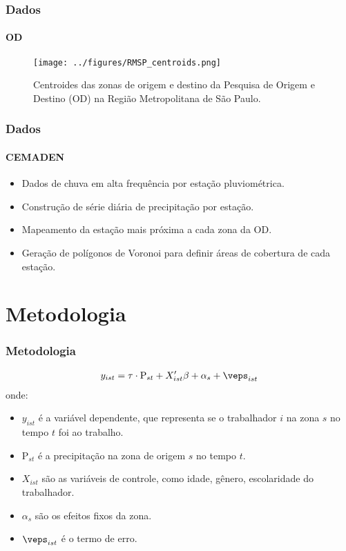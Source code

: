\begin{frame}[plain]
    \frametitle{Dados}
    \framesubtitle{OD}
    \begin{figure}[H]
        \centering
        \texttt{[image: ../figures/RMSP\_centroids.png]}
        \caption{Centroides das zonas de origem e destino da Pesquisa de Origem e Destino (OD) na Região Metropolitana de São Paulo.}
        \label{fig:od_centroids}
    \end{figure} 
\end{frame}



\begin{frame}
    \frametitle{Dados}
    \framesubtitle{CEMADEN}
    \begin{itemize}
    \item Dados de chuva em alta frequência por estação pluviométrica.
    \item Construção de série diária de precipitação por estação.
    \item Mapeamento da estação mais próxima a cada zona da OD.
    \item Geração de polígonos de Voronoi para definir áreas de cobertura de cada estação.
    \end{itemize}
\end{frame}

\section{Metodologia}
\begin{frame}[plain]
    \frametitle{Metodologia}
    \begin{align*}
    y_{ist} &= \tau \cdot \text{P}_{st} + X_{ist}'\beta + \alpha_{s} + \veps_{ist} \\ 
    \end{align*}
    onde:
    \begin{itemize}
        \item $y_{ist}$ é a variável dependente, que representa se o trabalhador $i$ na zona $s$ no tempo $t$ foi ao trabalho.
        \item $\text{P}_{st}$ é a precipitação na zona de origem $s$ no tempo $t$.
        \item $X_{ist}$ são as variáveis de controle, como idade, gênero, escolaridade do trabalhador.
        \item $\alpha_{s}$ são os efeitos fixos da zona.
        \item $\veps_{ist}$ é o termo de erro.
    \end{itemize}
\end{frame}

